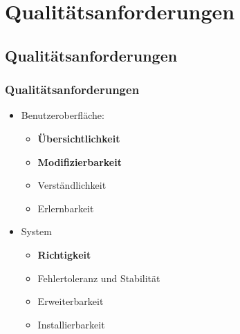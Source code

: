 \documentclass{beamer}
\begin{document}
\section{Qualitätsanforderungen}
\subsection{Qualitätsanforderungen}

\begin{frame}
\frametitle{Qualitätsanforderungen}
\begin{itemize}
\item Benutzeroberfläche:
\begin{itemize}
\item \textbf{Übersichtlichkeit}
\item \textbf{Modifizierbarkeit}
\item Verständlichkeit
\item Erlernbarkeit

\end{itemize}
\item System
\begin{itemize}
\item \textbf{Richtigkeit}
\item Fehlertoleranz und Stabilität
\item Erweiterbarkeit
\item Installierbarkeit
\end{itemize}
\end{itemize}
\end{frame}










\end{document}
